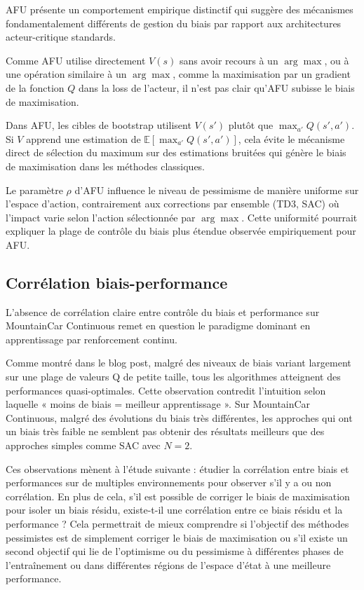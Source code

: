 \documentclass[a4paper, 12pt]{report}
\begin{document}
    AFU présente un comportement empirique distinctif qui suggère des
    mécanismes fondamentalement différents de gestion du biais par rapport aux
    architectures acteur-critique standards.

    Comme AFU utilise directement $V(s)$ sans avoir recours à un $\arg\max$, ou
    à une opération similaire à un $\arg\max$, comme la maximisation par un
    gradient de la fonction $Q$ dans la loss de l'acteur, il n'est pas clair
    qu'AFU subisse le biais de maximisation.

    Dans AFU, les cibles de bootstrap utilisent $V(s')$ plutôt
    que $\max_{a'} Q(s',a')$. Si $V$ apprend une estimation de
    $\mathbb{E}[\max_{a'} Q(s',a')]$, cela évite le mécanisme direct de
    sélection du maximum sur des estimations bruitées qui génère le biais de
    maximisation dans les méthodes classiques.

    Le paramètre $\rho$ d'AFU influence le niveau de pessimisme de manière
    uniforme sur l'espace d'action, contrairement aux corrections par ensemble
    (TD3, SAC) où l'impact varie selon l'action sélectionnée par $\arg\max$.
    Cette uniformité pourrait expliquer la plage de contrôle du biais plus
    étendue observée empiriquement pour AFU.

    \subsection{Corrélation biais-performance}

    L'absence de corrélation claire entre contrôle du biais et performance sur
    MountainCar Continuous remet en question le paradigme dominant en
    apprentissage par renforcement continu.

    Comme montré dans le blog post, malgré des niveaux de biais variant
    largement sur une plage de valeurs Q de petite taille, tous les algorithmes
    atteignent des performances quasi-optimales. Cette observation contredit
    l'intuition selon laquelle « moins de biais = meilleur apprentissage ». Sur
    MountainCar Continuous, malgré des évolutions du biais très différentes, les
    approches qui ont un biais très faible ne semblent pas obtenir des résultats
    meilleurs que des approches simples comme SAC avec $N=2$.

    Ces observations mènent à l'étude suivante : étudier la corrélation entre
    biais et performances sur de multiples environnements pour observer s'il y
    a ou non corrélation. En plus de cela, s'il est possible de corriger le
    biais de maximisation pour isoler un biais résidu, existe-t-il une
    corrélation entre ce biais résidu et la performance ? Cela permettrait de
    mieux comprendre si l'objectif des méthodes pessimistes est
    de simplement corriger le biais de maximisation ou s'il existe un second
    objectif qui lie de l'optimisme ou du pessimisme à différentes phases de
    l'entraînement ou dans différentes régions de l'espace d'état à une
    meilleure performance.
\end{document}
